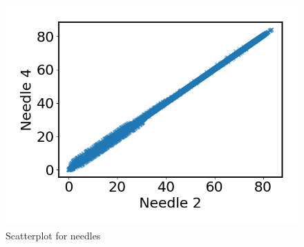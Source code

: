     \begin{figure}
        \centering
        \includegraphics[width=\textwidth]{report/figures/analysis/plant2_train_long/needle_scatterplots.png}
        \caption{Scatterplot for needles}
        \label{fig:anomaly_training_plant1}
    \end{figure}